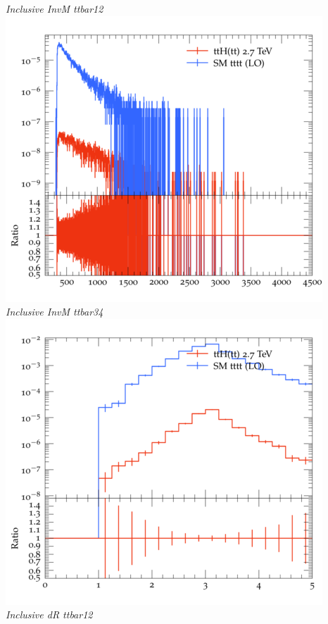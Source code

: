 \documentclass{beamer}
\begin{document}
\begin{frame}
\begin{columns}
\textit{\small Inclusive InvM ttbar12}
\includegraphics[width=\textwidth]{../plots/ttH_2700/tttt_ttH/Inclusive_InvM_ttbar34.png}\\
\textit{\small Inclusive InvM ttbar34}
\includegraphics[width=\textwidth]{../plots/ttH_2700/tttt_ttH/Inclusive_dR_ttbar12.png}\\
\textit{\small Inclusive dR ttbar12}
\end{columns}
\end{frame}
\end{document}
